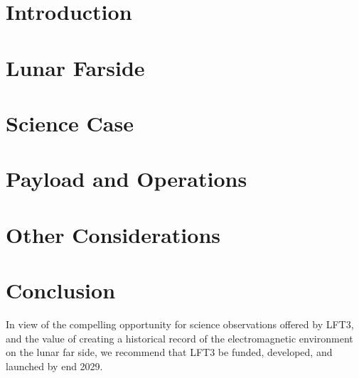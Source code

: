 \documentclass[preprint]{aastex631}
\begin{document}
\section{Introduction} 
\label{sec:intro}


\section{Lunar Farside}
\label{sec:Lunar Farside Location Conditions}


\section{Science Case}
\label{sec:science}


%

\section{Payload and Operations}
\label{sec:payload}


\section{Other Considerations}
\label{sec:otherconsiderations}



\section{Conclusion}

In view of the compelling opportunity for science observations offered by LFT3, and the value of creating a historical record of the electromagnetic environment on the lunar far side, we recommend that LFT3 be funded, developed, and launched by end 2029. 

{}



\end{document}
